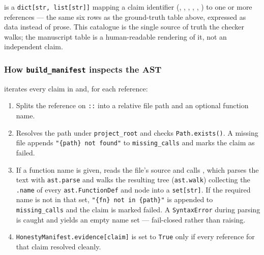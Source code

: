 \documentclass[
]{article}
\providecommand{\tightlist}{%
  \setlength{\itemsep}{0pt}\setlength{\parskip}{0pt}}
\begin{document}
 is a
\texttt{dict{[}str,\ list{[}str{]}{]}} mapping a claim identifier
(, ,
, ,
, ) to one
or more  references --- the
same six rows as the ground-truth table above, expressed as data instead
of prose. This catalogue is the single source of truth the checker
walks; the manuscript table is a human-readable rendering of it, not an
independent claim.

\subsubsection{\texorpdfstring{How \texttt{build\_manifest} inspects the
AST}{How build_manifest inspects the AST}}\label{how-build_manifest-inspects-the-ast}

 iterates every claim in
 and, for each 
reference:

\begin{enumerate}
\def\labelenumi{\arabic{enumi}.}
\tightlist
\item
  Splits the reference on \texttt{::} into a relative file path and an
  optional function name.
\item
  Resolves the path under \texttt{project\_root} and checks
  \texttt{Path.exists()}. A missing file appends
  \texttt{"\{path\}\ not\ found"} to \texttt{missing\_calls} and marks
  the claim as failed.
\item
  If a function name is given, reads the file's source and calls
  , which parses the
  text with \texttt{ast.parse} and walks the resulting tree
  (\texttt{ast.walk}) collecting the \texttt{.name} of every
  \texttt{ast.FunctionDef} and  node into a
  \texttt{set{[}str{]}}. If the required name is not in that set,
  \texttt{"\{fn\}\ not\ in\ \{path\}"} is appended to
  \texttt{missing\_calls} and the claim is marked failed. A
  \texttt{SyntaxError} during parsing is caught and yields an empty name
  set --- fail-closed rather than raising.
\item
  \texttt{HonestyManifest.evidence{[}claim{]}} is set to \texttt{True}
  only if every reference for that claim resolved cleanly.
\end{enumerate}
\end{document}
